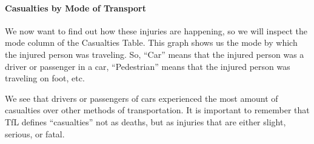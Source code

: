 \documentclass[
]{article}
\begin{document}
\hypertarget{casualties-by-mode-of-transport}{%
\paragraph{Casualties by Mode of
Transport}\label{casualties-by-mode-of-transport}}

We now want to find out how these injuries are happening, so we will
inspect the mode column of the Casualties Table. This graph shows us the
mode by which the injured person was traveling. So, ``Car'' means that
the injured person was a driver or passenger in a car, ``Pedestrian''
means that the injured person was traveling on foot, etc.

We see that drivers or passengers of cars experienced the most amount of
casualties over other methods of transportation. It is important to
remember that TfL defines ``casualties'' not as deaths, but as injuries
that are either slight, serious, or fatal.
\end{document}

